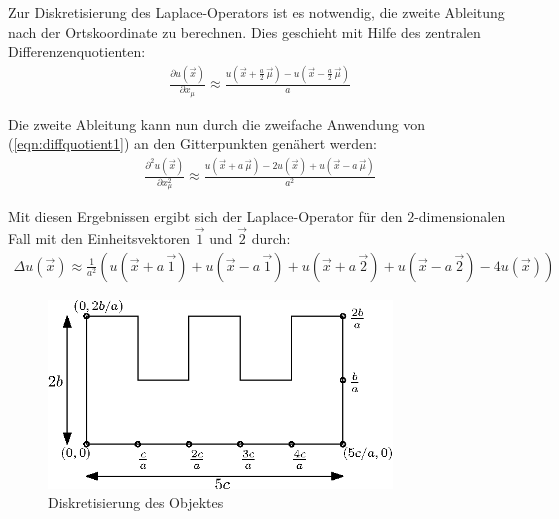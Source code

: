 \documentclass[10pt,a4paper]{article}
\begin{document}
Zur Diskretisierung des Laplace-Operators ist es notwendig, die zweite Ableitung nach der Ortskoordinate zu berechnen. Dies geschieht mit Hilfe des zentralen Differenzenquotienten:
\begin{align}
\frac{\partial u(\vec{x})}{\partial x_{\mu}}\approx\frac{u(\vec{x}+\frac{a}{2}\,\vec{\mu}) - u(\vec{x}-\frac{a}{2}\,\vec{\mu})}{a}
\label{eqn:diffquotient1}
\end{align}

Die zweite Ableitung kann nun durch die zweifache Anwendung von (\ref{eqn:diffquotient1}) an den Gitterpunkten genähert werden:
\begin{align}
\frac{\partial^2 u(\vec{x})}{\partial x_{\mu}^2}\approx\frac{u(\vec{x}+a\,\vec{\mu})-2 u(\vec{x})+u(\vec{x}-a\,\vec{\mu})}{a^2}
\label{eqn:diffquotient2}
\end{align}

Mit diesen Ergebnissen ergibt sich der Laplace-Operator für den $2$-dimensionalen Fall mit den Einheitsvektoren $\vec{1}$ und $\vec{2}$ durch:
\begin{align}
\Delta u(\vec{x})\approx\frac{1}{a^2}\left(u(\vec{x}+a\,\vec{1}) + u(\vec{x}-a\,\vec{1}) + u(\vec{x}+a\,\vec{2})+u(\vec{x}-a\,\vec{2}) -4 u(\vec{x})\right)
\label{eqn:diskret_laplace}
\end{align}

\begin{figure}[htbp!]
\centering
\includegraphics[height=5cm]{./figures/grid.eps}
\caption{Diskretisierung des Objektes}
\end{figure}
\end{document}

